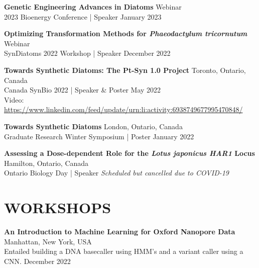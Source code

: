 \documentclass[a4paper,9pt]{extarticle}
\begin{document}
\noindent
\begin{minipage}{1\textwidth}
\setlength{\parindent}{15pt} %
	\noindent
	\textbf{Genetic Engineering Advances in Diatoms}  \hfill Webinar\\ 
	2023 Bioenergy Conference | Speaker  \hfill January 2023\\
\end{minipage}

\noindent
\begin{minipage}{1\textwidth}
\setlength{\parindent}{15pt} %
	\noindent
	\textbf{Optimizing Transformation Methods for \textit{Phaeodactylum tricornutum}}  \hfill Webinar\\ 
	SynDiatoms 2022 Workshop | Speaker  \hfill December 2022\\
\end{minipage}

\noindent
\begin{minipage}{1\textwidth}
\setlength{\parindent}{15pt} %
	\noindent
	\textbf{Towards Synthetic Diatoms: The Pt-Syn 1.0 Project}  \hfill Toronto, Ontario, Canada\\ 
	Canada SynBio 2022 | Speaker \& Poster  \hfill May 2022\\
	Video: \href{https://www.linkedin.com/feed/update/urn:li:activity:6938749677995470848/}{https://www.linkedin.com/feed/update/urn:li:activity:6938749677995470848/}\\
\end{minipage}

\noindent
\begin{minipage}{1\textwidth}
\setlength{\parindent}{15pt} %
	\noindent
	\textbf{Towards Synthetic Diatoms}  \hfill London, Ontario, Canada\\ 
	Graduate Research Winter Symposium | Poster  \hfill January 2022\\
\end{minipage}

\noindent
\begin{minipage}{1\textwidth}
\setlength{\parindent}{15pt} %
	\noindent
	\textbf{Assessing a Dose-dependent Role for the \textit{Lotus japonicus HAR1} Locus}  \hfill Hamilton, Ontario, Canada\\ 
	Ontario Biology Day | Speaker \hfill \textit{Scheduled but cancelled due to COVID-19}
\end{minipage}

\section*{WORKSHOPS}
\begin{minipage}{1\textwidth}
\setlength{\parindent}{15pt} %
	\noindent
	\textbf{An Introduction to Machine Learning for Oxford Nanopore Data}  \hfill Manhattan, New York, USA\\ 
	Entailed building a DNA basecaller using HMM's and a variant caller using a CNN.  \hfill December 2022
\end{minipage}
\end{document}
